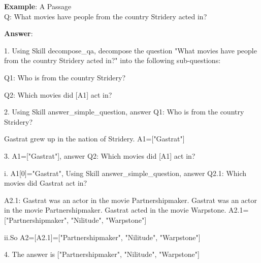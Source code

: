\documentclass{article} \usepackage{arxiv}
\begin{document}
\noindent\begin{minipage}{\textwidth} 
 \label{Tab:qa_skill}
\end{minipage}

\newpage


\begin{tcolorbox}[title = {An Example of Skill Composition for the CommaQA-E Task}, colback = Apricot!25!white, colframe = BrickRed!75!black] 
\textbf{Example}: A Passage \\ 
Q: What movies have people from the country Stridery acted in? 

\quad

\textbf{Answer}:

1. Using Skill decompose\_qa, decompose the question "What movies have people from the country Stridery acted in?" into the following sub-questions:  

\quad

\qquad Q1: Who is from the country Stridery? 

\qquad Q2: Which movies did [A1] act in? 

\quad

2. Using Skill answer\_simple\_question, answer Q1: Who is from the country Stridery? 

\quad 

\qquad  Gastrat grew up in the nation of Stridery. A1=["Gastrat"] 

\quad 

3. A1=["Gastrat"], answer Q2: Which movies did [A1] act in? 

\quad

 \qquad   i. A1[0]="Gastrat", Using Skill answer\_simple\_question, answer Q2.1: Which movies did Gastrat act in?  

  \qquad \quad A2.1: Gastrat was an actor in the movie Partnershipmaker. Gastrat was an actor in the movie Partnershipmaker. Gastrat acted in the movie Warpstone.  A2.1=["Partnershipmaker", "Nilitude", "Warpstone"] 

\quad
  
  \qquad  ii.So A2=[A2.1]=["Partnershipmaker", "Nilitude", "Warpstone"] 

\quad
  
4. The answer is ["Partnershipmaker", "Nilitude", "Warpstone"]
\end{tcolorbox}
\noindent\begin{minipage}{\textwidth}    
 \label{Tab:compose_qa_skill}
\end{minipage}
\end{document}
